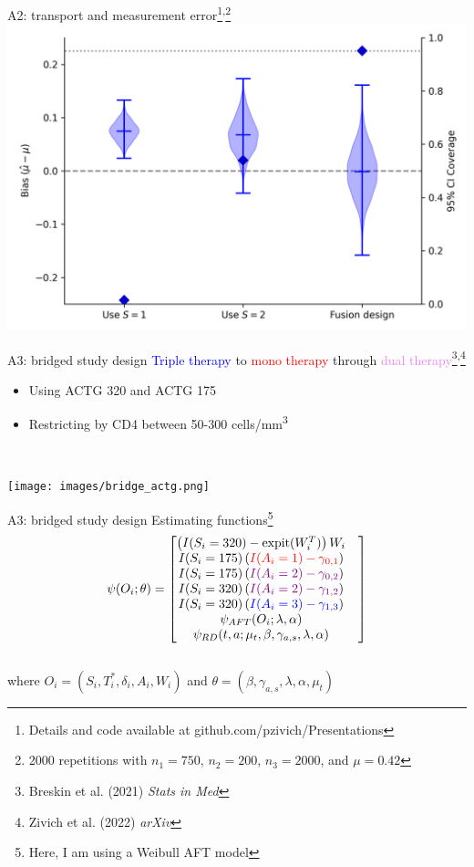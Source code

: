 \documentclass{beamer}
\newcommand{\blue}[1]{\textcolor{blue}{#1}}
\newcommand{\red}[1]{\textcolor{red}{#1}}
\newcommand{\violet}[1]{\textcolor{violet}{#1}}
\begin{document}
\begin{frame}{A2: transport and measurement error\footnote[frame]{Details and  code available at github.com/pzivich/Presentations}\textsuperscript{,}\footnote[frame]{2000 repetitions with $n_1=750$, $n_2=200$, $n_3=2000$, and $\mu=0.42$}}
	\centering 
	\includegraphics[scale=0.55]{images/sim_a2_results.png}
\end{frame}

\begin{frame}{A3: bridged study design}
	\blue{Triple therapy} to \red{mono therapy} through \violet{dual therapy}\footnote[frame]{Breskin et al. (2021) \textit{Stats in Med}}\textsuperscript{,}\footnote[frame]{Zivich et al. (2022) \textit{arXiv}}
	\begin{itemize}
		\item Using ACTG 320 and ACTG 175
		\item Restricting by CD4 between 50-300 cells/mm\textsuperscript{3}
	\end{itemize}~\\
	\begin{center}
			\texttt{[image: images/bridge\_actg.png]}
	\end{center}
\end{frame}

\begin{frame}{A3: bridged study design}
	Estimating functions\footnote[frame]{Here, I am using a Weibull AFT model}
	\[\psi(O_i; \theta) = 
	\begin{bmatrix}
		\left( I(S_i = 320) - \text{expit}(W_i^T) \right)W_i & \\
		I(S_i=175)\left(\red{I(A_i = 1) - \gamma_{0,1}} \right) & \\
		I(S_i=175)\left(\violet{I(A_i = 2) - \gamma_{0,2}} \right) & \\
		I(S_i=320)\left(\violet{I(A_i = 2) - \gamma_{1,2}} \right) & \\
		I(S_i=320)\left(\blue{I(A_i = 3) - \gamma_{1,3}} \right) & \\
		\psi_{AFT}(O_i; \lambda, \alpha) & \\
		\psi_{RD}(t, a; \mu_t, \beta, \gamma_{a,s}, \lambda, \alpha)
	\end{bmatrix}\]~\\
	where $O_i = (S_i, T_i^*, \delta_i, A_i, W_i)$ and $\theta = (\beta, \gamma_{a,s}, \lambda, \alpha, \mu_t)$
\end{frame}
\end{document}
